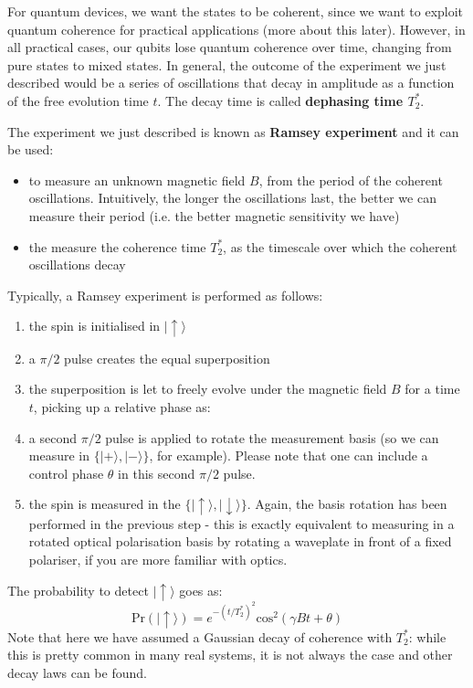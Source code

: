 \documentclass[a4paper,11pt]{article}
\newcommand{\ket}[1]{| #1 \rangle}
\begin{document}
For quantum devices, we want the states to be coherent, since we want to exploit quantum coherence for practical applications (more about this later). However, in all practical cases, our qubits lose quantum coherence over time, changing from pure states to mixed states. In general, the outcome of the experiment we just described would be a series of oscillations that decay in amplitude as a function of the free evolution time $t$. The decay time is called {\bf dephasing time $T_2^*$}.

The experiment we just described is known as {\bf Ramsey experiment} and it can be used:
\begin{itemize}
    \item to measure an unknown magnetic field $B$, from the period of the coherent oscillations. Intuitively, the longer the oscillations last, the better we can measure their period (i.e. the better magnetic sensitivity we have)
    \item the measure the coherence time $T_2^*$, as the timescale over which the coherent oscillations decay
\end{itemize}
Typically, a Ramsey experiment is performed as follows:
\begin{enumerate}
\item the spin is initialised in $\ket{\uparrow}$
\item a $\pi/2$ pulse creates the equal superposition
\item the superposition is let to freely evolve under the magnetic field $B$ for a time $t$, picking up a relative phase as: 
\item a second $\pi/2$ pulse is applied to rotate the measurement basis (so we can measure in $\lbrace \ket{+}, \ket{-} \rbrace$, for example). Please note that one can include a control phase $\theta$ in this second $\pi/2$ pulse.
\item the spin is measured in the $\lbrace \ket{\uparrow}, \ket{\downarrow} \rbrace$. Again, the basis rotation has been performed in the previous step - this is exactly equivalent to measuring in a rotated optical polarisation basis by rotating a waveplate in front of a fixed polariser, if you are more familiar with optics.
\end{enumerate}
The probability to detect $\ket{\uparrow}$ goes as:
\begin{equation}
    \mbox{Pr}(\ket{\uparrow}) = e^{-(t/T_2^*)^2} \mbox{cos}^2
\left( \gamma B t + \theta\right)
\end{equation}
Note that here we have assumed a Gaussian decay of coherence with $T_2^*$: while this is pretty common in many real systems, it is not always the case and other decay laws can be found.
\end{document}
